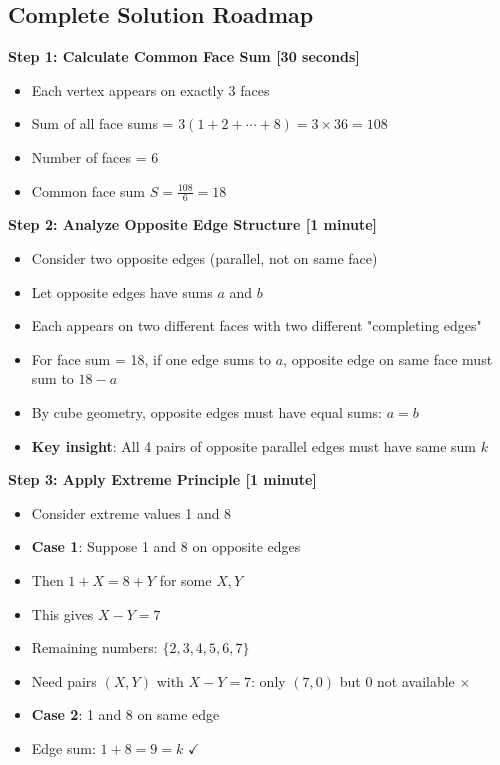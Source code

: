 \documentclass[]{article}
\begin{document}
\begin{solutionbox}
\subsection*{Complete Solution Roadmap}

\textbf{Step 1: Calculate Common Face Sum [30 seconds]}
\begin{itemize}[nosep]
    \item Each vertex appears on exactly 3 faces
    \item Sum of all face sums = $3(1+2+\cdots+8) = 3 \times 36 = 108$
    \item Number of faces = 6
    \item Common face sum $S = \frac{108}{6} = 18$
\end{itemize}

\textbf{Step 2: Analyze Opposite Edge Structure [1 minute]}
\begin{itemize}[nosep]
    \item Consider two opposite edges (parallel, not on same face)
    \item Let opposite edges have sums $a$ and $b$
    \item Each appears on two different faces with two different "completing edges"
    \item For face sum = 18, if one edge sums to $a$, opposite edge on same face must sum to $18-a$
    \item By cube geometry, opposite edges must have equal sums: $a = b$
    \item \textbf{Key insight}: All 4 pairs of opposite parallel edges must have same sum $k$
\end{itemize}

\textbf{Step 3: Apply Extreme Principle [1 minute]}
\begin{itemize}[nosep]
    \item Consider extreme values 1 and 8
    \item \textbf{Case 1}: Suppose 1 and 8 on opposite edges
    \item Then $1 + X = 8 + Y$ for some $X, Y$
    \item This gives $X - Y = 7$
    \item Remaining numbers: $\{2,3,4,5,6,7\}$
    \item Need pairs $(X,Y)$ with $X-Y=7$: only $(7,0)$ but 0 not available $\times$
    \item \textbf{Case 2}: 1 and 8 on same edge
    \item Edge sum: $1 + 8 = 9 = k$ $\checkmark$
\end{itemize}


\end{solutionbox}
\end{document}
